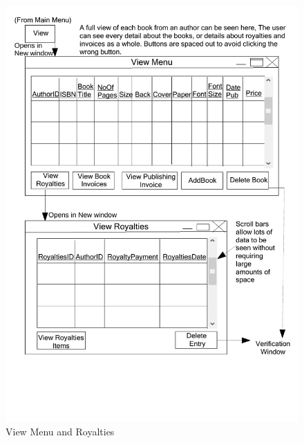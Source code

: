 \begin{figure}[H]
    \caption{View Menu and Royalties} \label{View_Menu_and_Royalties.pdf}
    \includegraphics[width=\textwidth]{./Design/UserInterfaceDesign/View_Menu_and_Royalties.pdf}
\end{figure}

